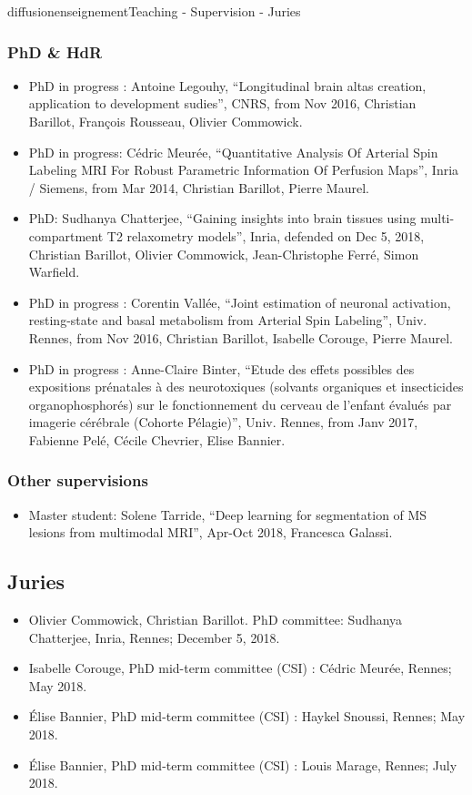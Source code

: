 \documentclass{ra2018}
\begin{document}
\begin{module}{diffusion}{enseignement}{Teaching - Supervision - Juries}
 \subsubsection{PhD \& HdR}
 \begin{itemize}
           \item PhD in progress : Antoine Legouhy, ``Longitudinal brain altas creation, application to development sudies'', CNRS, from Nov 2016, Christian Barillot, François Rousseau, Olivier Commowick.
           \item PhD in progress: Cédric Meurée, ``Quantitative Analysis Of Arterial Spin Labeling MRI For Robust Parametric Information Of Perfusion Maps'', Inria / Siemens, from Mar 2014, Christian Barillot, Pierre Maurel.
	   \item PhD: Sudhanya Chatterjee, ``Gaining insights into brain tissues using multi-compartment T2 relaxometry models'', Inria, defended on Dec 5, 2018, Christian Barillot, Olivier Commowick, Jean-Christophe Ferré, Simon Warfield.
           \item PhD in progress : Corentin Vallée, ``Joint estimation of neuronal activation, resting-state and basal metabolism from Arterial Spin Labeling'', Univ. Rennes, from Nov 2016, Christian Barillot, Isabelle Corouge, Pierre Maurel.
           \item PhD in progress : Anne-Claire Binter, ``Etude des effets possibles des expositions prénatales à des neurotoxiques (solvants organiques et insecticides organophosphorés) sur le fonctionnement du cerveau de l’enfant évalués par imagerie cérébrale (Cohorte Pélagie)'', Univ. Rennes, from Janv 2017, Fabienne Pelé, Cécile Chevrier, Elise Bannier.
  \end{itemize}

  \subsubsection{Other supervisions}
  \begin{itemize}
           \item Master student: Solene Tarride, ``Deep learning for segmentation of MS lesions from multimodal MRI'', Apr-Oct 2018, Francesca Galassi.
  \end{itemize}

\subsection {Juries}
\begin{itemize}
    \item Olivier Commowick, Christian Barillot. PhD committee: Sudhanya Chatterjee, Inria, Rennes; December 5, 2018.
    \item Isabelle Corouge, PhD mid-term committee (CSI) : Cédric Meurée, Rennes; May 2018.
    \item Élise Bannier, PhD mid-term committee (CSI) : Haykel Snoussi, Rennes; May 2018.
    \item Élise Bannier, PhD mid-term committee (CSI) : Louis Marage, Rennes; July 2018.
\end{itemize}


\end{module}
\end{document}
